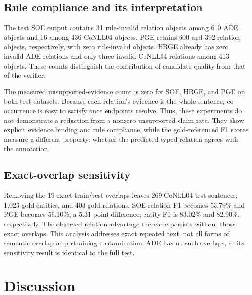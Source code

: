\documentclass[preprint,12pt]{elsarticle}
\begin{document}
\begin{table}[htbp]
\centering\scriptsize\setlength{\tabcolsep}{3pt}
\caption{Development-set ablation under the common strict-span evaluator
(micro \%). These rows characterize the fixed architecture and are
not additional promoted test systems.}
\label{tab:ablation}

\end{table}

\subsection{Rule compliance and its interpretation}
The test SOE output contains 31 rule-invalid relation objects among 610 ADE
objects and 16 among 436 CoNLL04 objects. PGE retains 600 and 392 relation
objects, respectively, with zero rule-invalid objects. HRGE already has zero
invalid ADE relations and only three invalid CoNLL04 relations among 413
objects. These counts distinguish the contribution of candidate quality from
that of the verifier.

The measured unsupported-evidence count is zero for SOE, HRGE, and PGE on both
test datasets. Because each relation's evidence is the whole sentence,
co-occurrence is easy to satisfy once endpoints resolve. Thus, these
experiments do not demonstrate a reduction from a nonzero unsupported-claim
rate. They show explicit evidence binding and rule compliance, while the
gold-referenced F1 scores measure a different property: whether the predicted
typed relation agrees with the annotation.

\subsection{Exact-overlap sensitivity}
Removing the 19 exact train/test overlaps leaves 269 CoNLL04 test sentences,
1,023 gold entities, and 403 gold relations. SOE relation F1 becomes 53.79\%
and PGE becomes 59.10\%, a 5.31-point difference; entity F1 is 83.02\% and
82.90\%, respectively. The observed relation advantage therefore persists
without those exact overlaps. This analysis addresses exact repeated text,
not all forms of semantic overlap or pretraining contamination. ADE has no
such overlaps, so its sensitivity result is identical to the full test.

\section{Discussion}
\label{sec:discussion}
\end{document}
